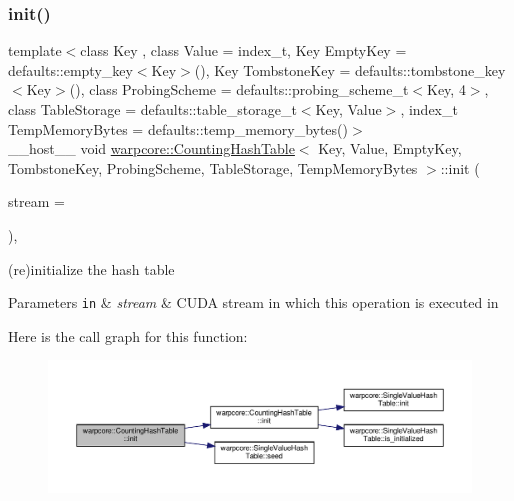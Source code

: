 \subsubsection{\texorpdfstring{init()}{init()}\hspace{0.1cm}{\footnotesize\ttfamily [2/2]}}
{\footnotesize\ttfamily template$<$class Key , class Value  = index\+\_\+t, Key Empty\+Key = defaults\+::empty\+\_\+key$<$\+Key$>$(), Key Tombstone\+Key = defaults\+::tombstone\+\_\+key$<$\+Key$>$(), class Probing\+Scheme  = defaults\+::probing\+\_\+scheme\+\_\+t$<$\+Key, 4$>$, class Table\+Storage  = defaults\+::table\+\_\+storage\+\_\+t$<$\+Key, Value$>$, index\+\_\+t Temp\+Memory\+Bytes = defaults\+::temp\+\_\+memory\+\_\+bytes()$>$ \\
\+\_\+\+\_\+host\+\_\+\+\_\+ void \hyperlink{classwarpcore_1_1CountingHashTable}{warpcore\+::\+Counting\+Hash\+Table}$<$ Key, Value, Empty\+Key, Tombstone\+Key, Probing\+Scheme, Table\+Storage, Temp\+Memory\+Bytes $>$\+::init (\begin{DoxyParamCaption}\item[{const cuda\+Stream\+\_\+t}]{stream = {} }\end{DoxyParamCaption})\hspace{0.3cm}{\ttfamily [inline]}, {\ttfamily [noexcept]}}



(re)initialize the hash table 


\begin{DoxyParams}[1]{Parameters}
\mbox{\tt in}  & {\em stream} & C\+U\+DA stream in which this operation is executed in \\
\hline
\end{DoxyParams}
Here is the call graph for this function\+:
\nopagebreak
\begin{figure}[H]
\begin{center}
\leavevmode
\includegraphics[width=350pt]{classwarpcore_1_1CountingHashTable_a8b7a93faf9c5746c2665b4b775f9de88_cgraph}
\end{center}
\end{figure}
\mbox{\label{classwarpcore_1_1CountingHashTable_a2cad25fea134d836cf1b75f67d6b38ac}} 

